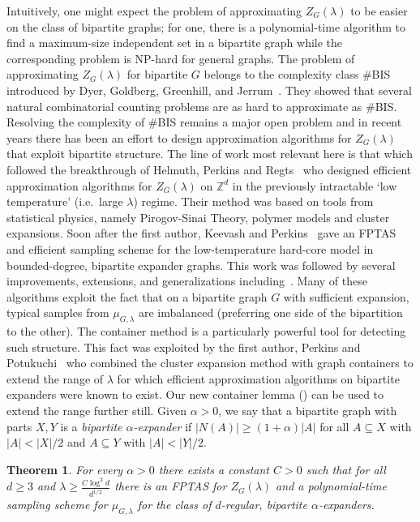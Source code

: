 \documentclass[10pt,a4paper]{amsart}
\newtheorem{thm}{Theorem}[section]
\theoremstyle{definition}
\newcommand{\Z}{\mathbb{Z}}
\newcommand{\0}[0]{\emptyset}
\newcommand{\lam}{\lambda}
\begin{document}
Intuitively, one might expect the problem of approximating $Z_G(\lam)$ to be easier on the class of bipartite graphs; for one, there is a polynomial-time algorithm to find a maximum-size independent set in  a bipartite graph while the corresponding problem is NP-hard for general graphs. The problem of approximating $Z_G(\lam)$ for bipartite $G$ belongs to the complexity class  \#BIS introduced by Dyer, Goldberg, Greenhill, and Jerrum~\cite{dyer2000relative}. They showed that several natural combinatorial counting problems are as hard to approximate as \#BIS. Resolving the complexity of \#BIS remains a major open problem and in recent years there has been an effort to design approximation algorithms for $Z_G(\lam)$ that exploit bipartite structure. The line of work most relevant here is that which followed the breakthrough of Helmuth, Perkins and Regts~\cite{HelmuthAlgorithmic2} who designed efficient approximation algorithms for  $Z_G(\lam)$ on $\Z^d$ in the previously intractable `low temperature' (i.e.\ large $\lam$) regime. Their method was based on tools from statistical physics, namely Pirogov-Sinai Theory, polymer models and cluster expansions. Soon after the first author, Keevash and Perkins~\cite{JKP2} gave an FPTAS and efficient sampling scheme for the low-temperature hard-core model in bounded-degree, bipartite expander graphs. This work was followed by several improvements, extensions, and generalizations including~\cite{cannon2020counting,chen2021fast,chen2021sampling,friedrich2020polymer,galanis2020fast,galanis2021fast,liao2019counting}.  Many of these algorithms exploit the fact that on a bipartite graph $G$ with sufficient expansion, typical samples from $\mu_{G,\lam}$ are imbalanced (preferring one side of the bipartition to the other). The container method is a particularly powerful tool for detecting such structure. This fact was exploited by the first author, Perkins and Potukuchi~\cite{jenssen2023approximately} who combined the cluster expansion method with graph containers to extend the range of $\lam$ for which efficient approximation algorithms on bipartite expanders were known to exist. Our new container lemma () can be used to extend the range further still. Given $\alpha>0$, we say that a bipartite graph with parts $X,Y$ is a \emph{bipartite $\alpha$-expander} if $|N(A)|\geq (1+\alpha)|A|$ for all $A\subseteq X$ with $|A|<|X|/2$ and $A\subseteq Y$ with $|A|<|Y|/2$. 

\begin{thm}\label{algos}
    For every $\alpha>0$ there exists a constant $C>0$ such that for all $d\geq 3$ and $\lam\geq \frac{C\log^2 d}{d^{1/2}}$ there is an FPTAS for $Z_G(\lam)$ and a polynomial-time sampling scheme for $\mu_{G, \lam}$ for the class of $d$-regular, bipartite $\alpha$-expanders.
\end{thm}
\end{document}
